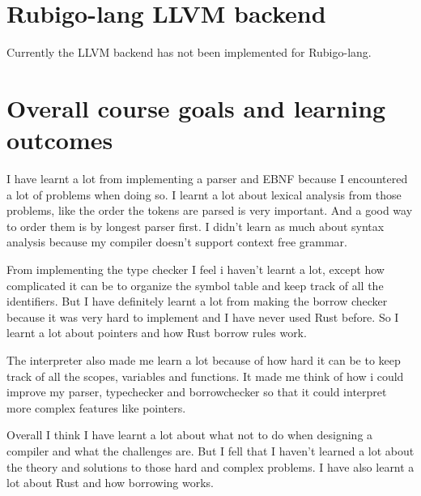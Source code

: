 \documentclass[12pt]{article}
\begin{document}
    \section{Rubigo-lang LLVM backend}	
    	Currently the LLVM backend has not been implemented for Rubigo-lang.
	


    \section{Overall course goals and learning outcomes}
    	I have learnt a lot from implementing a parser and EBNF because I encountered a lot of problems when doing so. I learnt a lot about lexical analysis from those problems, like the order the tokens are parsed is very important. And a good way to order them is by longest parser first. I didn't learn as much about syntax analysis because my compiler doesn't support context free grammar.

	From implementing the type checker I feel i haven't learnt a lot, except how complicated it can be to organize the symbol table and keep track of all the identifiers. But I have definitely learnt a lot from making the borrow checker because it was very hard to implement and I have never used Rust before. So I learnt a lot about pointers and how Rust borrow rules work.

	The interpreter also made me learn a lot because of how hard it can be to keep track of all the scopes, variables and functions. It made me think of how i could improve my parser, typechecker and borrowchecker so that it could interpret more complex features like pointers.

	Overall I think I have learnt a lot about what not to do when designing a compiler and what the challenges are. But I fell that I haven't learned a lot about the theory and solutions to those hard and complex problems. I have also learnt a lot about Rust and how borrowing works.

	
\end{document}
